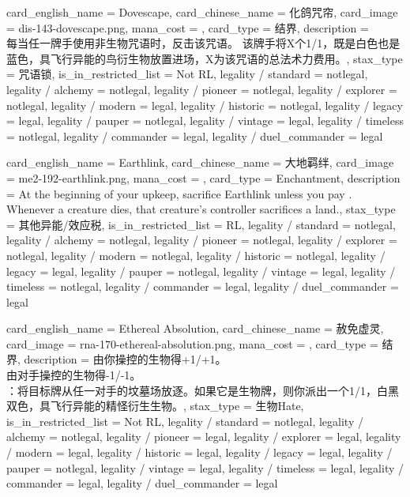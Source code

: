 \documentclass[lang = cn, color = black, 10pt]{AllThatStax}
\begin{document}
\card
{
	card_english_name = {Dovescape},
	card_chinese_name = {化鸽咒帘},
	card_image = dis-143-dovescape.png,
	mana_cost = ,
	card_type = 结界,
	description = {\\
		每当任一牌手使用非生物咒语时，反击该咒语。 该牌手将X个1/1，既是白色也是蓝色，具飞行异能的鸟衍生物放置进场，X为该咒语的总法术力费用。},
	stax_type = 咒语锁,
	is_in_restricted_list = Not RL,
	legality / standard = notlegal,
	legality / alchemy = notlegal,
	legality / pioneer = notlegal,
	legality / explorer = notlegal,
	legality / modern = legal,
	legality / historic = notlegal,
	legality / legacy = legal,
	legality / pauper = notlegal,
	legality / vintage = legal,
	legality / timeless = notlegal,
	legality / commander = legal,
	legality / duel_commander = legal
}

\card
{
	card_english_name = {Earthlink},
	card_chinese_name = {大地羁绊},
	card_image = me2-192-earthlink.png,
	mana_cost = ,
	card_type = Enchantment,
	description = {At the beginning of your upkeep, sacrifice Earthlink unless you pay .\\
		Whenever a creature dies, that creature's controller sacrifices a land.},
	stax_type = 其他异能/效应税,
	is_in_restricted_list = RL,
	legality / standard = notlegal,
	legality / alchemy = notlegal,
	legality / pioneer = notlegal,
	legality / explorer = notlegal,
	legality / modern = notlegal,
	legality / historic = notlegal,
	legality / legacy = legal,
	legality / pauper = notlegal,
	legality / vintage = legal,
	legality / timeless = notlegal,
	legality / commander = legal,
	legality / duel_commander = legal
}

\card
{
	card_english_name = {Ethereal Absolution},
	card_chinese_name = {赦免虚灵},
	card_image = rna-170-ethereal-absolution.png,
	mana_cost = ,
	card_type = 结界,
	description = {由你操控的生物得+1/+1。\\
		由对手操控的生物得-1/-1。\\
		：将目标牌从任一对手的坟墓场放逐。如果它是生物牌，则你派出一个1/1，白黑双色，具飞行异能的精怪衍生生物。},
	stax_type = 生物Hate,
	is_in_restricted_list = Not RL,
	legality / standard = notlegal,
	legality / alchemy = notlegal,
	legality / pioneer = legal,
	legality / explorer = legal,
	legality / modern = legal,
	legality / historic = legal,
	legality / legacy = legal,
	legality / pauper = notlegal,
	legality / vintage = legal,
	legality / timeless = legal,
	legality / commander = legal,
	legality / duel_commander = legal
}
\end{document}
